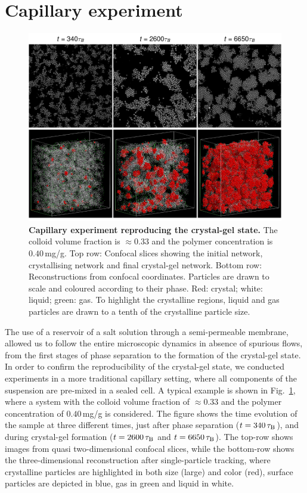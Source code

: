 \section*{Capillary experiment}

\begin{figure}[!t]
\includegraphics{capillary.pdf}
\caption{\textbf{Capillary experiment reproducing the crystal-gel state.} The colloid volume fraction is $\approx 0.33$ and the polymer concentration is $0.40\,$mg/g. Top row: Confocal slices showing the initial network, crystallising network and final crystal-gel network. Bottom row: Reconstructions from confocal coordinates. Particles are drawn to scale and coloured according to their phase. Red: crystal; white: liquid; green: gas. To highlight the crystalline regions, liquid and gas particles are drawn to a tenth of the crystalline particle size.}
\label{fig:capillary}
\end{figure}


The use of a reservoir of a salt solution through a semi-permeable membrane, allowed us to follow the entire microscopic dynamics in absence of spurious flows, from the first stages of phase separation to the formation of the crystal-gel state. In order to confirm the reproducibility of the crystal-gel state, we conducted experiments in a more traditional capillary setting, where all components of the suspension are pre-mixed in a sealed cell. A typical example is
shown in Fig.~\ref{fig:capillary}, where a system with the colloid volume fraction of $\approx 0.33$ and the polymer concentration of $0.40\,$mg/g is considered.
The figure shows the time evolution of the sample at three different times, just after phase separation ($t=340\,\tau_{\rm B}$), and during
crystal-gel formation ($t=2600\,\tau_{\rm B}$ and $t=6650\,\tau_{\rm B}$). The top-row shows images from quasi two-dimensional confocal slices, while the bottom-row shows
the three-dimensional reconstruction after single-particle tracking, where crystalline particles are highlighted in both size (large) and color (red), surface particles
are depicted in blue, gas in green and liquid in white.

